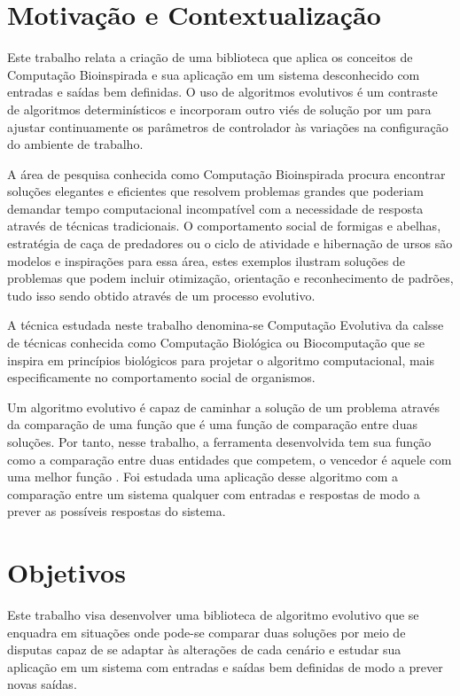 \section{Motivação e Contextualização}

\newcommand\SE{\sigla{SE}{Sistema Evolutivo}\xspace}

Este trabalho relata a criação de uma biblioteca que aplica os conceitos de Computação Bioinspirada e sua aplicação em um sistema desconhecido com entradas e saídas bem definidas. O uso de algoritmos evolutivos é um contraste de algoritmos determinísticos  e incorporam outro viés de solução por um \SE\cite{Layzell1999} para ajustar continuamente os parâmetros de controlador às variações na configuração do ambiente de trabalho.

A área de pesquisa conhecida como Computação Bioinspirada procura encontrar soluções elegantes e eficientes que resolvem problemas grandes que poderiam demandar tempo computacional incompatível com a necessidade de resposta através de técnicas tradicionais. O comportamento social de formigas e abelhas, estratégia de caça de predadores ou o ciclo de atividade e hibernação de ursos são modelos e inspirações para essa área, estes exemplos ilustram soluções de problemas que podem incluir otimização, orientação e reconhecimento de padrões, tudo isso sendo obtido através de um processo evolutivo.\cite{Simoes2000}

A técnica estudada neste trabalho denomina-se Computação Evolutiva da calsse de técnicas conhecida como Computação Biológica ou Biocomputação que se inspira em princípios biológicos para projetar o algoritmo computacional, mais especificamente no comportamento social de organismos.

Um algoritmo evolutivo é capaz de caminhar a solução de um problema através da comparação de uma função \fitness que é uma função de comparação entre duas soluções. Por tanto, nesse trabalho, a ferramenta desenvolvida tem sua função \fitness como a comparação entre duas entidades que competem, o vencedor é aquele com uma melhor função \fitness. Foi estudada uma aplicação desse algoritmo com a comparação entre um sistema qualquer com entradas e respostas de modo a prever as possíveis respostas do sistema.

\section{Objetivos}

Este trabalho visa desenvolver uma biblioteca de algoritmo evolutivo que se enquadra em situações onde pode-se comparar duas soluções por meio de disputas capaz de se adaptar às alterações de cada cenário e estudar sua aplicação em um sistema com entradas e saídas bem definidas de modo a prever novas saídas.

